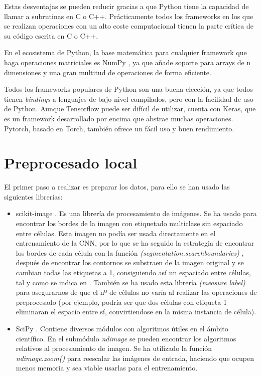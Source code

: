 Estas desventajas se pueden reducir gracias a que Python tiene la capacidad de llamar a subrutinas en C o C++. Prácticamente todos los frameworks en los que se realizan operaciones con un alto coste computacional tienen la parte crítica de su código escrita en C o C++.

En el ecosistema de Python, la base matemática para cualquier framework que haga operaciones matriciales es NumPy \cite{VanDerWalt2011}, ya que añade soporte para arrays de n dimensiones y una gran multitud de operaciones de forma eficiente.

Todos los frameworks populares de Python son una buena elección, ya que todos tienen \textit{bindings} a lenguajes de bajo nivel compilados, pero con la facilidad de uso de Python. Aunque Tensorflow puede ser difícil de utilizar, cuenta con Keras, que es un framework desarrollado por encima que abstrae muchas operaciones. Pytorch, basado en Torch, también ofrece un fácil uso y buen rendimiento.

\section{Preprocesado local}\label{sec:local_preprocessing}

El primer paso a realizar es preparar los datos, para ello se han usado las siguientes librerías:

\begin{itemize}
\item scikit-image \cite{Walt2014}. Es una librería de procesamiento de imágenes. Se ha usado para encontrar los bordes de la imagen con etiquetado multiclase sin espaciado entre células. Esta imagen no podía ser usada directamente en el entrenamiento de la CNN, por lo que se ha seguido la estrategia de encontrar los bordes de cada célula con la función \textit{(segmentation.searchboundaries)} \cite{Wolny2020}, después de encontrar los contornos se substraen de la imagen original y se cambian todas las etiquetas a 1, consiguiendo así un espaciado entre células, tal y como se indica en \cite{Falk2019}. También se ha usado esta librería \textit{(measure label)} para asegurarnos de que el nº de células no varía al realizar las operaciones de preprocesado (por ejemplo, podría ser que dos células con etiqueta 1 eliminaran el espacio entre sí, convirtiendose en la misma instancia de célula).
\item SciPy \cite{Virtanen2020}. Contiene diversos módulos con algoritmos útiles en el ámbito científico. En el submódulo \textit{ndimage} se pueden encontrar los algoritmos relativos al procesamiento de imagen. Se ha utilizado la función \textit{ndimage.zoom()} para reescalar las imágenes de entrada, haciendo que ocupen menos memoria y sea viable usarlas para el entrenamiento.
\end{itemize}